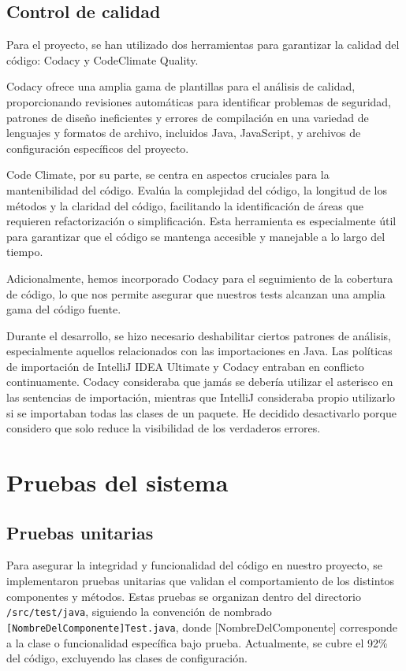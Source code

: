 \subsection{Control de calidad}
Para el proyecto, se han utilizado dos herramientas para garantizar la calidad del código: Codacy y CodeClimate Quality.

Codacy ofrece una amplia gama de plantillas para el análisis de calidad, proporcionando revisiones automáticas para identificar problemas de seguridad, patrones de diseño ineficientes y errores de compilación en una variedad de lenguajes y formatos de archivo, incluidos Java, JavaScript, y archivos de configuración específicos del proyecto. 

Code Climate, por su parte, se centra en aspectos cruciales para la mantenibilidad del código. Evalúa la complejidad del código, la longitud de los métodos y la claridad del código, facilitando la identificación de áreas que requieren refactorización o simplificación. Esta herramienta es especialmente útil para garantizar que el código se mantenga accesible y manejable a lo largo del tiempo.

Adicionalmente, hemos incorporado Codacy para el seguimiento de la cobertura de código, lo que nos permite asegurar que nuestros tests alcanzan una amplia gama del código fuente.

Durante el desarrollo, se hizo necesario deshabilitar ciertos patrones de análisis, especialmente aquellos relacionados con las importaciones en Java. Las políticas de importación de IntelliJ IDEA Ultimate y Codacy entraban en conflicto continuamente. Codacy consideraba que jamás se debería utilizar el asterisco en las sentencias de importación, mientras que IntelliJ consideraba propio utilizarlo si se importaban todas las clases de un paquete. He decidido desactivarlo porque considero que solo reduce la visibilidad de los verdaderos errores.

\section{Pruebas del sistema}
\subsection{Pruebas unitarias}
Para asegurar la integridad y funcionalidad del código en nuestro proyecto, se implementaron pruebas unitarias que validan el comportamiento de los distintos componentes y métodos. Estas pruebas se organizan dentro del directorio \verb|/src/test/java|, siguiendo la convención de nombrado \verb|[NombreDelComponente]Test.java|, donde [NombreDelComponente] corresponde a la clase o funcionalidad específica bajo prueba. Actualmente, se cubre el 92\% del código, excluyendo las clases de configuración.

